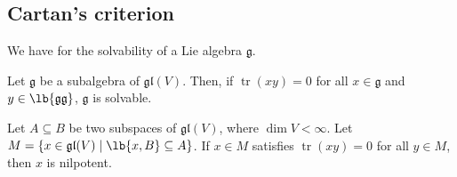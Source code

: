 \documentclass{article}
\DeclarePairedDelimiter\lb\lbrack\rbrack
\DeclareMathOperator{\tr}{tr}
\newcommand*\frkg{{\ensuremath{\mathfrak{g}}}}
\newcommand*\gl{\ensuremath{\mathfrak{gl}}}
\begin{document}
\subsection{Cartan's criterion}

We have  for the solvability of a Lie algebra $\frkg$.

\begin{theorem}
    Let $\frkg$ be a subalgebra of $\gl(V)$.
    Then, if $\tr(xy) = 0$ for all $x \in \frkg$ and $y \in \lb{\frkg\frkg}$, $\frkg$ is solvable.
\end{theorem}

\begin{lemma}
    \label{lem:TraceNilpotence}
    Let $A \subseteq B$ be two subspaces of $\gl(V)$, where $\dim V < \infty$.
    Let $M = \{x \in \gl(V) \mid \lb{x,B} \subseteq A\}$.
    If $x \in M$ satisfies $\tr(xy) = 0$ for all $y \in M$, then $x$ is nilpotent.
\end{lemma}
\end{document}

